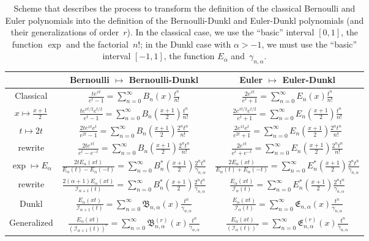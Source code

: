 \documentclass[10pt]{article}
\theoremstyle{plain}
\theoremstyle{definition}
\numberwithin{equation}{section} %
\newcommand{\Ea}{E_{\alpha}}
\newcommand{\I}{\mathcal{I}}
\newcommand{\B}{\mathfrak{B}}
\newcommand{\E}{\mathfrak{E}}
\newcommand{\cc}{\gamma}
\begin{document}
\begin{table}[!tb]
\newcommand{\suml}{\sum\limits}
\centering
\hspace*{-1cm}%
\begin{tabular}{ccc}
\hline
\rule[-4pt]{0pt}{14pt} & Bernoulli $\mapsto$ Bernoulli-Dunkl & Euler $\mapsto$ Euler-Dunkl 
\\
\hline
\rule{0pt}{15pt}
Classical %
& $\frac{te^{xt}}{e^t-1} = \suml_{n=0}^{\infty} B_n(x) \frac{t^n}{n!}$
& $\frac{2e^{xt}}{e^t+1} = \suml_{n=0}^{\infty} E_n(x) \frac{t^n}{n!}$
\\[9pt]
$x \mapsto \frac{x+1}{2}$
& $\frac{te^{xt/2}e^{t/2}}{e^t-1} = \suml_{n=0}^{\infty} B_n(\frac{x+1}{2}) \frac{t^n}{n!}$
& $\frac{2e^{xt/2}e^{t/2}}{e^t+1} = \suml_{n=0}^{\infty} E_n(\frac{x+1}{2}) \frac{t^n}{n!}$
\\
$t \mapsto 2t$
& $\frac{2te^{xt}e^{t}}{e^{2t}-1} = \suml_{n=0}^{\infty} B_n(\frac{x+1}{2}) \frac{2^n t^n}{n!}$
& $\frac{2e^{xt}e^{t}}{e^{2t}+1} = \suml_{n=0}^{\infty} E_n(\frac{x+1}{2}) \frac{2^n t^n}{n!}$
\\[9pt]
rewrite
& $\frac{2te^{xt}}{e^{t}-e^{-t}} = \suml_{n=0}^{\infty} B_n(\frac{x+1}{2}) \frac{2^n t^n}{n!}$
& $\frac{2e^{xt}}{e^t+e^{-t}} = \suml_{n=0}^{\infty} E_n(\frac{x+1}{2}) \frac{2^n t^n}{n!}$
\\[9pt]
$\exp \mapsto \Ea$ %
& $\frac{2t\Ea(xt)}{\Ea(t)-\Ea(-t)} 
= \suml_{n=0}^{\infty} B_{n}^{*}(\frac{x+1}{2}) \frac{2^n t^n}{\cc_{n,\alpha}}$
& $\frac{2\Ea(xt)}{\Ea(t)+\Ea(-t)} 
= \suml_{n=0}^{\infty} E_{n}^{*}(\frac{x+1}{2}) \frac{2^n t^n}{\cc_{n,\alpha}}$
\\[9pt]
rewrite
& $\frac{2(\alpha+1)\Ea(xt)}{\I_{\alpha+1}(t)} 
= \suml_{n=0}^{\infty} B_{n}^{*}(\frac{x+1}{2}) \frac{2^n t^n}{\cc_{n,\alpha}}$
& $\frac{\Ea(xt)}{\I_{\alpha}(t)}
= \suml_{n=0}^{\infty} E_{n}^{*}(\frac{x+1}{2}) \frac{2^n t^n}{\cc_{n,\alpha}}$
\\[9pt]
Dunkl %
& $\frac{\Ea(xt)}{\I_{\alpha+1}(t)} 
= \suml_{n=0}^{\infty} \B_{n,\alpha}(x) \frac{t^n}{\cc_{n,\alpha}}$
& $\frac{\Ea(xt)}{\I_{\alpha}(t)}
= \suml_{n=0}^{\infty} \E_{n,\alpha}(x) \frac{t^n}{\cc_{n,\alpha}}$
\\[9pt]
Generalized %
& $\frac{\Ea(xt)}{(\I_{\alpha+1}(t))^r} 
= \suml_{n=0}^{\infty} \B_{n,\alpha}^{(r)}(x) \frac{t^n}{\cc_{n,\alpha}}$
& $\frac{\Ea(xt)}{(\I_{\alpha}(t))^r}
= \suml_{n=0}^{\infty} \E_{n,\alpha}^{(r)}(x) \frac{t^n}{\cc_{n,\alpha}}$
\\[9pt]
\hline
\end{tabular}%
\hspace*{-1cm}
\caption{Scheme that describes the process to transform the definition of the classical Bernoulli and Euler polynomials into the definition of the Bernoulli-Dunkl and Euler-Dunkl polynomials (and their generalizations of order~$r$).
In the classical case, we use the ``basic'' interval $[0,1]$, the function $\exp$ and the factorial~$n!$; in the Dunkl case  with $\alpha>-1$, we must use the ``basic'' interval $[-1,1]$, the function $\Ea$ and~$\cc_{n,\alpha}$.}
\label{tab:scheme}
\end{table}
\end{document}
